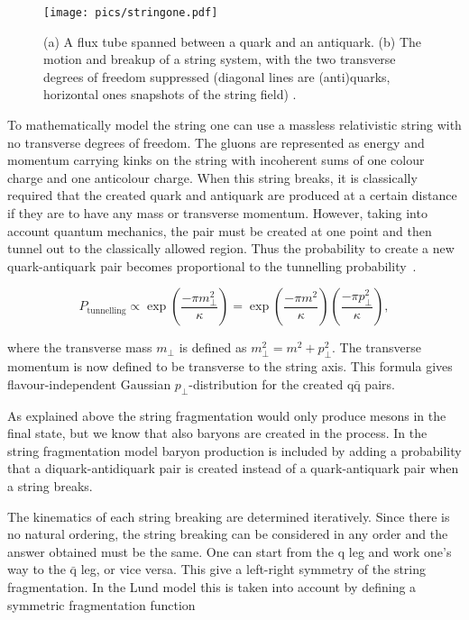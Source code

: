 \begin{figure}
\centering
\texttt{[image: pics/stringone.pdf]}
\caption[]{ (a) A flux tube spanned between a quark and an antiquark. (b) The motion
and breakup of a string system, with the two transverse degrees of freedom suppressed
(diagonal lines are (anti)quarks, horizontal ones snapshots of the string field) \cite{eventGenerators}.
 }
\label{fig:fluxtube}
\end{figure}

To mathematically model the string one can use a massless relativistic string with no transverse degrees of freedom. The gluons are represented as energy and momentum carrying kinks on the string with incoherent sums of one colour charge and one anticolour charge. When this string breaks, it is classically required that the created quark and antiquark are produced at a certain distance if they are to have any mass or transverse momentum. However, taking into account quantum mechanics, the pair must be created at one point and then tunnel out to the classically allowed region. Thus the probability to create a new quark-antiquark pair becomes proportional to the tunnelling probability~\cite{ANDERSSON198331}.


\begin{equation}
P_\mathrm{tunnelling} \propto \exp \left(\frac{-\pi m_\perp^2}{\kappa} \right) = \exp \left(\frac{-\pi m^2}{\kappa} \right) \left(\frac{-\pi p_\perp^2}{\kappa} \right),
\end{equation}

\noindent where the transverse mass $m_\perp$ is defined as $m_\perp^2 = m^2 + p_\perp ^2$. The transverse momentum is now defined to be transverse to the string axis. This formula gives flavour-independent Gaussian $p_\perp$-distribution for the created $\mathrm{q \bar q}$ pairs.

As explained above the string fragmentation would only produce mesons in the final state, but we know that also baryons are created in the process. In the string fragmentation model baryon production is included by adding a probability that a diquark-antidiquark pair is created instead of a quark-antiquark pair when a string breaks.

The kinematics of each string breaking are determined iteratively. Since there is no natural ordering, the string breaking can be considered in any order and the answer obtained must be the same. One can start from the q leg and work one's way to the $\bar{\mathrm{q}}$ leg, or vice versa. This give a left-right symmetry of the string fragmentation. In the Lund model this is taken into account by defining a symmetric fragmentation function

